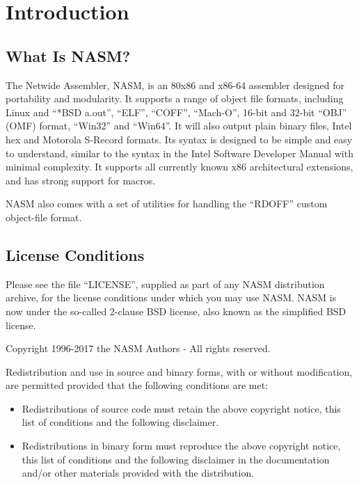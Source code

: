 \chapter{Introduction}

\section{What Is NASM?}

The Netwide Assembler, NASM, is an 80x86 and x86-64 assembler designed
for portability and modularity. It supports a range of object file
formats, including Linux and ``*BSD a.out'', ``ELF'', ``COFF'',
``Mach-O'', 16-bit and 32-bit ``OBJ'' (OMF) format, ``Win32'' and
``Win64''. It will also output plain binary files, Intel hex and
Motorola S-Record formats. Its syntax is designed to be simple and
easy to understand, similar to the syntax in the Intel Software
Developer Manual with minimal complexity. It supports all currently
known x86 architectural extensions, and has strong support for macros.

NASM also comes with a set of utilities for handling the ``RDOFF''
custom object-file format.

\section{License Conditions}

Please see the file  ``LICENSE'', supplied as part
of any NASM distribution archive, for the license conditions under
which you may use NASM. NASM is now under the so-called 2-clause
BSD license, also known as the simplified BSD license.

Copyright 1996-2017 the NASM Authors - All rights reserved.

Redistribution and use in source and binary forms, with or without
modification, are permitted provided that the following conditions are
met:

\begin{itemize}
	\item{Redistributions of source code must retain the above copyright
	notice, this list of conditions and the following disclaimer.}

	\item{Redistributions in binary form must reproduce the above copyright
	notice, this list of conditions and the following disclaimer in the
	documentation and/or other materials provided with the distribution.}
\end{itemize}

